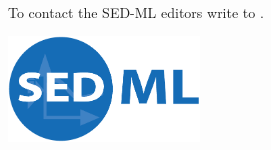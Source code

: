 \begin{titlepage}
\begin{center}
\begin{minipage}{5in}
\begin{center}
  \paragraph*{}
  To contact the SED-ML editors write to .
\end{center}
\end{minipage}
\vfill


\centerline{\includegraphics[width=2in]{images/logoSedml.png}}


\end{center}

\end{titlepage}

%
%

\setcounter{page}{2}



